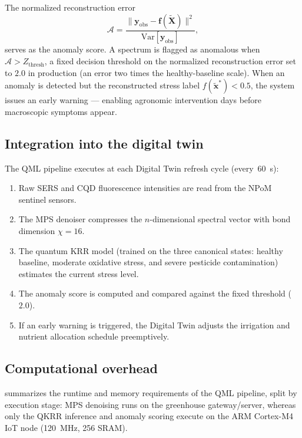 \documentclass[11pt,a4paper]{article}
\begin{document}
The normalized reconstruction error
\begin{equation}\label{eq:SI_anomaly_score}
\mathcal{A} = \frac{\|\mathbf{y}_{\mathrm{obs}} - \mathbf{f}(\tilde{\mathbf{X}})\|^2}{\mathrm{Var}[\mathbf{y}_{\mathrm{obs}}]},
\end{equation}
serves as the anomaly score. A spectrum is flagged as anomalous when $\mathcal{A} > Z_{\mathrm{thresh}}$, a fixed decision threshold on the normalized reconstruction error set to $2.0$ in production (an error two times the healthy-baseline scale). When an anomaly is detected but the reconstructed stress label $f(\tilde{\mathbf{x}}^*) < 0.5$, the system issues an early warning --- enabling agronomic intervention days before macroscopic symptoms appear.

\subsection{Integration into the digital twin}

The QML pipeline executes at each Digital Twin refresh cycle (every~\qty{60}{\s}):
\begin{enumerate}
\item Raw SERS and CQD fluorescence intensities are read from the NPoM sentinel sensors.
\item The MPS denoiser compresses the $n$-dimensional spectral vector with bond dimension $\chi = 16$.
\item The quantum KRR model (trained on the three canonical states: healthy baseline, moderate oxidative stress, and severe pesticide contamination) estimates the current stress level.
\item The anomaly score is computed and compared against the fixed threshold ($2.0$).
\item If an early warning is triggered, the Digital Twin adjusts the irrigation and nutrient allocation schedule preemptively.
\end{enumerate}

\subsection{Computational overhead}

 summarizes the runtime and memory requirements of the QML pipeline, split by execution stage: MPS denoising runs on the greenhouse gateway/server, whereas only the QKRR inference and anomaly scoring execute on the ARM Cortex-M4 IoT node (\qty{120}{\MHz}, \qty{256}{\kB} SRAM).
\end{document}
